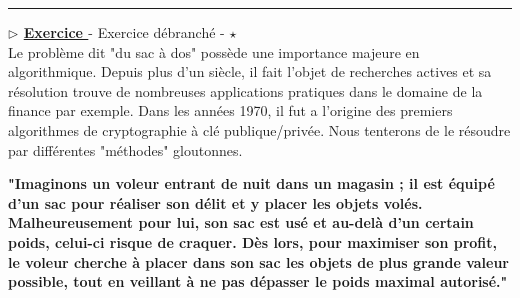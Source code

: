 \documentclass[12pt,french]{article}
\newcounter{npb}
\newcommand{\exo}{
    \stepcounter{npb}
    {\textbf{$\triangleright$ \underline{Exercice \arabic{npb} }}}
}
\begin{document}
\hrule
\medskip
\exo  - Exercice débranché - $\star$ \\
Le problème dit "du sac à dos" possède une importance majeure en algorithmique. Depuis plus d'un siècle, il fait l'objet de recherches actives et sa résolution trouve de nombreuses applications pratiques dans le domaine de la finance par exemple. Dans les années 1970, il fut a l'origine des premiers algorithmes de cryptographie à clé publique/privée. Nous tenterons de le résoudre par différentes "méthodes" gloutonnes.\\
\vspace{3mm}
\begin{tcolorbox}[enhanced,attach boxed title to top center={yshift=-3mm,yshifttext=-1mm},
	colback=red!5!white,colframe=red!75!black,colbacktitle=red!25!black,
	title=Enoncé du problème, fonttitle=\bfseries,
	boxed title style={size=small,colframe=red!25!black} ]
	\textbf{"Imaginons un voleur entrant de nuit dans un magasin ; il est équipé  d'un sac pour réaliser son délit et y placer les objets volés. Malheureusement pour lui, son sac est usé et au-delà d'un certain poids, celui-ci risque de craquer. Dès lors, pour maximiser son profit, le voleur cherche à placer dans son sac les objets de plus grande valeur possible, tout en veillant à ne pas dépasser le poids maximal autorisé."}
\end{tcolorbox}
\vspace{2mm}
\end{document}
